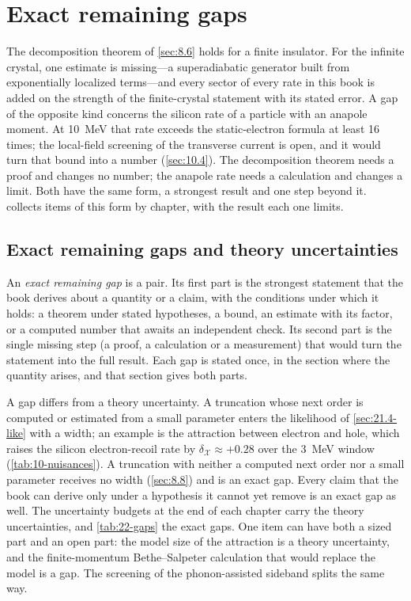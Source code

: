 \section{Exact remaining gaps}\label{sec:22.2}

The decomposition theorem of \cref{sec:8.6} holds for a finite insulator. For the infinite crystal, one estimate is missing—a superadiabatic generator built from exponentially localized terms—and every sector of every rate in this book is added on the strength of the finite-crystal statement with its stated error. A gap of the opposite kind concerns the silicon rate of a particle with an anapole moment. At \SI{10}{MeV} that rate exceeds the static-electron formula at least 16 times; the local-field screening of the transverse current is open, and it would turn that bound into a number (\cref{sec:10.4}). The decomposition theorem needs a proof and changes no number; the anapole rate needs a calculation and changes a limit. Both have the same form, a strongest result and one step beyond it.  collects items of this form by chapter, with the result each one limits.

\subsection{Exact remaining gaps and theory uncertainties}\label{sec:22.2-definition}

\begin{keyresult}
An \emph{exact remaining gap} is a pair. Its first part is the strongest statement that the book derives about a quantity or a claim, with the conditions under which it holds: a theorem under stated hypotheses, a bound, an estimate with its factor, or a computed number that awaits an independent check. Its second part is the single missing step (a proof, a calculation or a measurement) that would turn the statement into the full result. Each gap is stated once, in the section where the quantity arises, and that section gives both parts.
\end{keyresult}

A gap differs from a theory uncertainty. A truncation whose next order is computed or estimated from a small parameter enters the likelihood of \cref{sec:21.4-like} with a width; an example is the attraction between electron and hole, which raises the silicon electron-recoil rate by $\delta_{\mathcal{X}} \approx +0.28$ over the \SI{3}{MeV} window (\cref{tab:10-nuisances}). A truncation with neither a computed next order nor a small parameter receives no width (\cref{sec:8.8}) and is an exact gap. Every claim that the book can derive only under a hypothesis it cannot yet remove is an exact gap as well. The uncertainty budgets at the end of each chapter carry the theory uncertainties, and \cref{tab:22-gaps} the exact gaps. One item can have both a sized part and an open part: the model size of the attraction is a theory uncertainty, and the finite-momentum Bethe--Salpeter calculation that would replace the model is a gap. The screening of the phonon-assisted sideband splits the same way.

